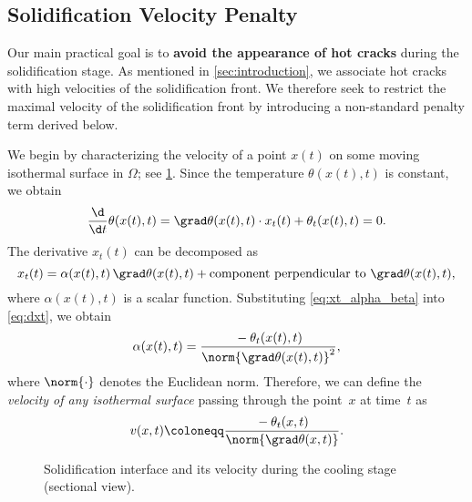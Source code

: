 \subsection{Solidification Velocity Penalty}
\label{subsec:velocity}

Our main practical goal is to \textbf{avoid the appearance of hot cracks} during the solidification stage. 
As mentioned in \cref{sec:introduction}, we associate hot cracks with high velocities of the solidification front.
We therefore seek to restrict the maximal velocity of the solidification front by introducing a non-standard penalty term derived below.

We begin by characterizing the velocity of a point $x(t)$ on some moving isothermal surface in $\Omega$; see \cref{fig:velocity}.
Since the temperature $\theta(x(t),t)$ is constant, we obtain
\begin{equation} \label{eq:dxt}
	\frac{\d}{\d t} \theta(x(t),t) 
	= 
	\grad \theta(x(t),t) \cdot x_t(t) + \theta_t(x(t),t) 
	= 
	0
	.
\end{equation}
The derivative $x_t(t)$ can be decomposed as
\begin{equation} \label{eq:xt_alpha_beta}
	x_t(t) 
	= 
	\alpha(x(t),t) \, \grad \theta(x(t),t) + \text{component perpendicular to } \grad \theta(x(t),t),
\end{equation}
where $\alpha(x(t),t)$ is a scalar function. 
Substituting \eqref{eq:xt_alpha_beta} into \eqref{eq:dxt}, we obtain 
\begin{equation}
	\alpha(x(t),t) 
	= 
	\frac{{}-{} \theta_t(x(t),t)}{\norm{\grad \theta(x(t),t)}^2}
	,
\end{equation}
where $\norm{\cdot}$ denotes the Euclidean norm.
Therefore, we can define the \emph{velocity of any isothermal surface} passing through the point~$x$ at time~$t$ as
\begin{equation}
	v(x,t) 
	\coloneqq 
	\frac{{}-{} \theta_t(x,t)}{\norm{\grad \theta(x,t)}}
	.
\end{equation}

\begin{figure}
	\centering
	
	\caption{Solidification interface and its velocity during the cooling stage (sectional view).}
	\label{fig:velocity}
\end{figure}

